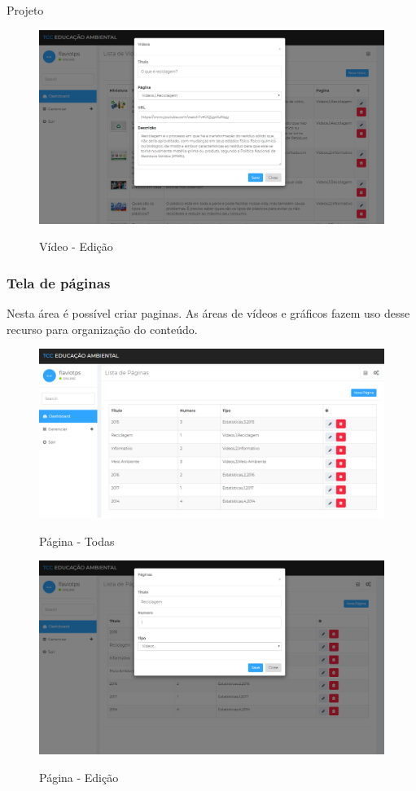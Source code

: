 \documentclass[
	12pt,				%
	openright,			%
	twoside,			%
	a4paper,			%
	english,			%
	french,				%
	spanish,			%
	brazil				%
	]{abntex2}
\begin{document}
\begin{chapter}{Projeto}
\begin{figure}[h]
\centering
   \caption{Vídeo - Edição}
   \includegraphics[scale=0.40]{media/tela_video_site_2.png}
     \label{fig:tela_video_site_2}
\end{figure}

\newpage
\subsubsection{Tela de páginas}
Nesta área é possível criar paginas. As áreas de vídeos e gráficos fazem uso desse recurso para organização do conteúdo.

\begin{figure}[h]
\centering
   \caption{Página - Todas}
   \includegraphics[scale=0.40]{media/tela_pagina_site_1.png}
     \label{fig:tela_pagina_site_1}
\end{figure}

\begin{figure}[h]
\centering
   \caption{Página - Edição}
   \includegraphics[scale=0.40]{media/tela_pagina_site_2.png}
     \label{fig:tela_pagina_site_2}
\end{figure}
\newpage

\end{chapter}
\end{document}
